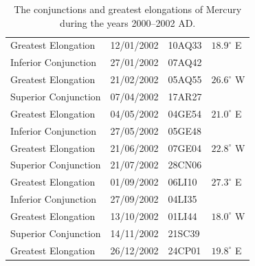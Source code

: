 \begin{table}[!h]
{\begin{tabular}{lcll}
Greatest Elongation & 12/01/2002 & 10AQ33 & $18.9^\circ$ E\\
Inferior Conjunction & 27/01/2002 & 07AQ42&\\
Greatest Elongation & 21/02/2002 & 05AQ55 & $26.6^\circ$ W\\
Superior Conjunction & 07/04/2002 & 17AR27&\\
Greatest Elongation & 04/05/2002 & 04GE54 & $21.0^\circ$ E\\
Inferior Conjunction & 27/05/2002 & 05GE48&\\
Greatest Elongation & 21/06/2002 & 07GE04 & $22.8^\circ$ W\\
Superior Conjunction & 21/07/2002 & 28CN06&\\
Greatest Elongation & 01/09/2002 & 06LI10 & $27.3^\circ$ E\\
Inferior Conjunction & 27/09/2002 & 04LI35&\\
Greatest Elongation & 13/10/2002 & 01LI44 & $18.0^\circ$ W\\
Superior Conjunction & 14/11/2002 & 21SC39&\\
Greatest Elongation & 26/12/2002 & 24CP01 & $19.8^\circ$ E\\
\end{tabular}}
\caption{The conjunctions and greatest elongations of Mercury
during the years 2000--2002 AD.}\label{vtmercury}
\end{table}
